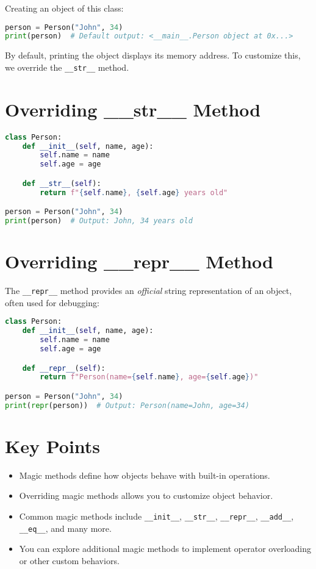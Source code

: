 Creating an object of this class:

\begin{lstlisting}[language=Python]
person = Person("John", 34)
print(person)  # Default output: <__main__.Person object at 0x...>
\end{lstlisting}

By default, printing the object displays its memory address. To customize this, we override the \texttt{\_\_str\_\_} method.

\section{Overriding \_\_str\_\_ Method}

\begin{lstlisting}[language=Python]
class Person:
    def __init__(self, name, age):
        self.name = name
        self.age = age

    def __str__(self):
        return f"{self.name}, {self.age} years old"

person = Person("John", 34)
print(person)  # Output: John, 34 years old
\end{lstlisting}

\section{Overriding \_\_repr\_\_ Method}

The \texttt{\_\_repr\_\_} method provides an \emph{official} string representation of an object, often used for debugging:

\begin{lstlisting}[language=Python]
class Person:
    def __init__(self, name, age):
        self.name = name
        self.age = age

    def __repr__(self):
        return f"Person(name={self.name}, age={self.age})"

person = Person("John", 34)
print(repr(person))  # Output: Person(name=John, age=34)
\end{lstlisting}

\section{Key Points}

\begin{itemize}
    \item Magic methods define how objects behave with built-in operations.
    \item Overriding magic methods allows you to customize object behavior.
    \item Common magic methods include \texttt{\_\_init\_\_}, \texttt{\_\_str\_\_}, \texttt{\_\_repr\_\_}, \texttt{\_\_add\_\_}, \texttt{\_\_eq\_\_}, and many more.
    \item You can explore additional magic methods to implement operator overloading or other custom behaviors.
\end{itemize}

